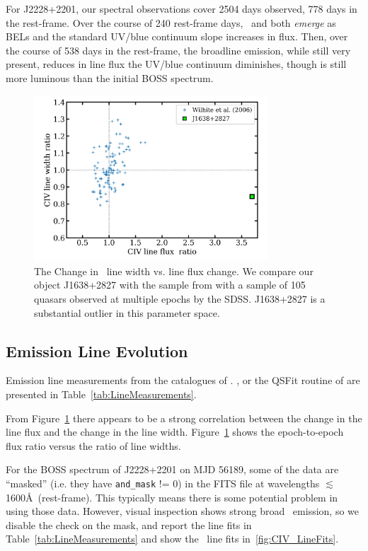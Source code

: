 \documentclass[a4paper,fleqn,usenatbib]{mnras}
\begin{document}
For J2228+2201, our spectral observations cover 2504 days observed,
778 days in the rest-frame. Over the course of 240 rest-frame days,
\civ\ and \ciii both {\it emerge} as BELs and the standard UV/blue
continuum slope increases in flux.  Then, over the course of 538 days
in the rest-frame, the broadline emission, while still very present,
reduces in line flux the UV/blue continuum diminishes, though is still
more luminous than the initial BOSS spectrum.

\begin{figure}
  \centering
  \includegraphics[width=8.7cm, trim=0.2cm 0.2cm 0.2cm 0.2cm, clip]
  {figures/Wilhite_2006_Fig2_redux_20190926.png}
   \vspace{-12pt}
  \caption[]{The Change in \civ\ line width vs. line flux change. 
We compare our object J1638+2827 with the sample 
from \citet{Wilhite2006} with a sample of 105 quasars observed at
multiple epochs by the SDSS. J1638+2827 is a substantial outlier 
in this parameter space.}
  \label{fig:Wilhite2006_comparison}
\end{figure}
\subsection{Emission Line Evolution}
Emission line measurements from the catalogues of \citet{Shen2011}.
\citet{Hamann2017}, \citet{Kozlowski2017} or the QSFit routine of
\citet{Calderone2017} are presented in Table~\ref{tab:LineMeasurements}.

From Figure~\ref{fig:Wilhite2006_comparison} there appears to be a
strong correlation between the change in the line flux and the change
in the line width.  Figure~\ref{fig:Wilhite2006_comparison} shows the
epoch-to-epoch flux ratio versus the ratio of line widths.

For the BOSS spectrum of J2228+2201 on MJD 56189, some of the data are
``masked'' (i.e. they have {\tt and\_mask} != 0) in the FITS file at
wavelengths $\lesssim$1600\AA\ (rest-frame).  This typically means
there is some potential problem in using those data. However, visual
inspection shows strong broad \civ\ emission, so we disable the check on the mask,
and report the line fits in Table~\ref{tab:LineMeasurements} and show the \civ\ line 
fits in~\ref{fig:CIV_LineFits}.
\end{document}
